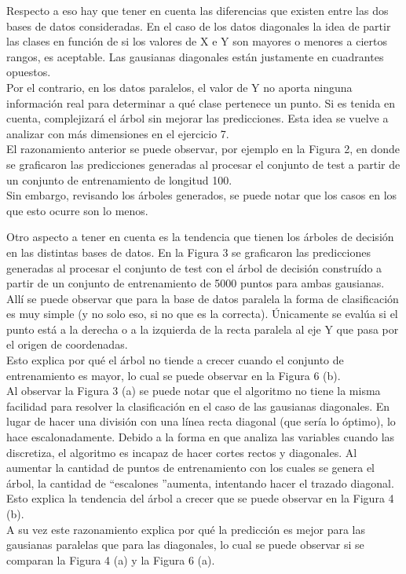 \documentclass[12pt, a4paper]{article}
\begin{document}
\medskip

Respecto a eso hay que tener en cuenta las diferencias que existen entre las dos bases de datos consideradas. En el caso de los datos diagonales la idea de partir las clases en función de si los valores de X e Y son mayores o menores a ciertos rangos, es aceptable. Las gausianas diagonales están justamente en cuadrantes opuestos. 
\\ Por el contrario, en los datos paralelos, el valor de Y no aporta ninguna información real para determinar a qué clase pertenece un punto. Si es tenida en cuenta, complejizará el árbol sin mejorar las predicciones. Esta idea se vuelve a analizar con más dimensiones en el ejercicio 7.\\
El razonamiento anterior se puede observar, por ejemplo en la Figura 2, en donde se graficaron las predicciones generadas al procesar el conjunto de test a partir de un conjunto de entrenamiento de longitud 100.
\\ Sin embargo, revisando los árboles generados, se puede notar que los casos en los que esto ocurre son lo menos.

\medskip

Otro aspecto a tener en cuenta es la tendencia que tienen los árboles de decisión en las distintas bases de datos. En la Figura 3 se graficaron las predicciones generadas al procesar el conjunto de test con el árbol de decisión construído a partir de un conjunto de entrenamiento de 5000 puntos para ambas gausianas. \\
Allí se puede observar que para la base de datos paralela la forma de clasificación es muy simple (y no solo eso, si no que es la correcta). Únicamente se evalúa si el punto está a la derecha o a la izquierda de la recta paralela al eje Y que pasa por el origen de coordenadas.\\
Esto explica por qué el árbol no tiende a crecer cuando el conjunto de entrenamiento es mayor, lo cual se puede observar en la Figura 6 (b).\\
Al observar la Figura 3 (a) se puede notar que el algoritmo no tiene la misma facilidad para resolver la clasificación en el caso de las gausianas diagonales. En lugar de hacer una división con una línea recta diagonal (que sería lo óptimo), lo hace escalonadamente. Debido a la forma en que analiza las variables cuando las discretiza, el algoritmo es incapaz de hacer cortes rectos y diagonales. Al aumentar la cantidad de puntos de entrenamiento con los cuales se genera el árbol, la cantidad de \textquotedblleft escalones \textquotedblright aumenta, intentando hacer el trazado diagonal. Esto explica la tendencia del árbol a crecer que se puede observar en la Figura 4 (b).\\
A su vez este razonamiento explica por qué la predicción es mejor para las gausianas paralelas que para las diagonales, lo cual se puede observar si se comparan la Figura 4 (a) y la Figura 6 (a).
\end{document}
